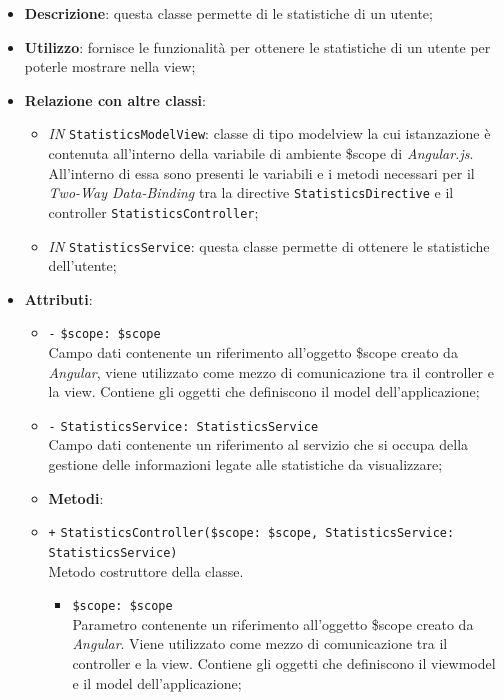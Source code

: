 \begin{itemize}
	\item \textbf{Descrizione}: questa classe permette di le statistiche di un utente;
	\item \textbf{Utilizzo}: fornisce le funzionalità per ottenere le statistiche di un utente per poterle mostrare nella view;
	\item \textbf{Relazione con altre classi}:
	\begin{itemize}
		\item \textit{IN} \texttt{StatisticsModelView}: classe di tipo modelview la cui istanzazione è contenuta all'interno della variabile di ambiente \$scope di \textit{Angular.js}. All'interno di essa sono presenti le variabili e i metodi necessari per il \textit{Two-Way Data-Binding} tra la directive \texttt{StatisticsDirective} e il controller \texttt{StatisticsController}; 
		\item \textit{IN} \texttt{StatisticsService}: questa classe permette di ottenere le statistiche dell'utente;
	\end{itemize}
	\item \textbf{Attributi}:
	\begin{itemize}
		\item \texttt{-} \texttt{\$scope: \$scope} \\
		Campo dati contenente un riferimento all’oggetto \$scope creato da \textit{Angular}, viene utilizzato come mezzo di comunicazione tra il controller e la view. Contiene gli oggetti che definiscono il model dell’applicazione;
		\item \texttt{-} \texttt{StatisticsService: StatisticsService} \\
		Campo dati contenente un riferimento al servizio che si occupa della gestione delle informazioni legate alle statistiche da visualizzare;
	\end{itemize}	
	\begin{itemize}
		\item \textbf{Metodi}:
		\item \texttt{+} \texttt{StatisticsController(\$scope: \$scope, StatisticsService: StatisticsService)} \\ 
		Metodo costruttore della classe. \\
		\begin{itemize}
			\item \texttt{\$scope: \$scope} \\
			Parametro contenente un riferimento all’oggetto \$scope creato da \textit{Angular}. Viene utilizzato come mezzo di comunicazione tra il controller e la view. Contiene gli oggetti che definiscono il viewmodel e il model dell’applicazione;

\end{itemize}
\end{itemize}
\end{itemize}
